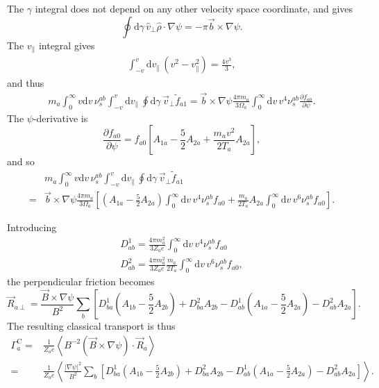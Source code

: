 \documentclass[12pt, a4paper]{article}
\newcommand{\p}{\ensuremath{\partial}}
\renewcommand{\d}{\ensuremath{\mathrm{d}}}
\newcommand{\lang}{\left\langle}
\newcommand{\rang}{\right\rangle}
\begin{document}
The $\gamma$ integral does not depend on any other velocity space coordinate, and gives
\begin{equation}
\oint \d\gamma \, \hat{v}_\perp \hat{\rho} \cdot \nabla \psi = - \pi\vec{b} \times \nabla \psi.
\end{equation}
The $v_\|$ integral gives
\begin{align}
 \int_{-v}^v \d v_\|\, (v^2 - v_\|^2) = \frac{4v^3}{3},
\end{align}
and thus
\begin{align}
m_a \int_0^\infty v  \d v \, \nu_s^{ab} \int_{-v}^v \d v_\| \, \oint \d\gamma\,  \vec{v}_\perp \tilde{f}_{a1} = \vec{b} \times \nabla \psi \frac{4\pi m_a}{3\Omega_a} \int_0^\infty \d v \, v^4 \nu_s^{ab} \frac{\p f_{a0}}{\p \psi}.
\end{align}
The $\psi$-derivative is
\begin{equation}
\frac{\p f_{a0}}{\p \psi} = f_{a0} \left[A_{1a} - \frac{5}{2} A_{2a} + \frac{m_av^2}{2T_a}  A_{2a}\right], \label{eq:dpsifM}
\end{equation}
and so
\begin{equation}
\begin{aligned}
  &m_a \int_0^\infty v  \d v \, \nu_s^{ab} \int_{-v}^v \d v_\| \, \oint \d\gamma\,  \vec{v}_\perp \tilde{f}_{a1} \\
  =& \vec{b} \times \nabla \psi \frac{4\pi m_a}{3\Omega_a} \left[\left(A_{1a} - \frac{5}{2} A_{2a}\right) \int_0^\infty \d v \, v^4 \nu_s^{ab}  f_{a0} + \frac{m_a}{2T_a} A_{2a} \int_0^\infty \d v \, v^6 \nu_s^{ab}  f_{a0}  \right].
\end{aligned}
\end{equation}

Introducing
\begin{align}
  D^1_{ab} = \frac{4\pi m_a^2}{3 Z_a e} \int_0^\infty \d v \, v^4 \nu_s^{ab}  f_{a0} \\
  D^2_{ab} = \frac{4\pi m_a^2}{3 Z_a e} \frac{m_a}{2T_a} \int_0^\infty \d v \, v^6 \nu_s^{ab}  f_{a0},
\end{align}
the perpendicular friction becomes
\begin{equation}
 \vec{R}_{a\perp} = \frac{\vec{B} \times \nabla \psi}{B^2} \sum_b \left[D^1_{ba}\left(A_{1b} - \frac{5}{2} A_{2b}\right) + D^2_{ba}A_{2b}  -D^1_{ab}\left(A_{1a} - \frac{5}{2} A_{2a}\right) - D^2_{ab}A_{2a}\right].
\end{equation}
The resulting classical transport is thus
\begin{equation}
  \begin{aligned}
    \Gamma_a^{\text{C}} = &\frac{1}{Z_a e} \lang B^{-2} \left(\vec{B} \times \nabla \psi\right) \cdot \vec{R}_a \rang \\
    = & 
  \frac{1}{Z_a e}\lang \frac{|\nabla \psi|^2}{B^2} \sum_b \left[D^1_{ba}\left(A_{1b} - \frac{5}{2} A_{2b}\right) + D^2_{ba}A_{2b}  -D^1_{ab}\left(A_{1a} - \frac{5}{2} A_{2a}\right) - D^2_{ab}A_{2a}\right] \rang.
\end{aligned}
\end{equation}
\end{document}
